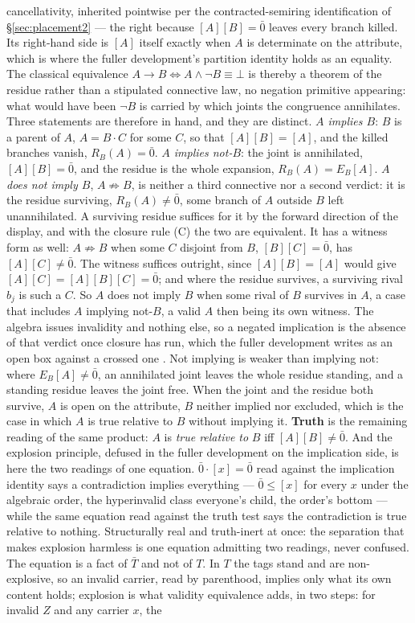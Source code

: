 cancellativity, inherited pointwise per the contracted-semiring identification of \S\ref{sec:placement2} --- the right because $[A][B] = \bar{0}$ leaves every branch killed. Its right-hand side is $[A]$ itself exactly when $A$ is determinate on the attribute, which is where the fuller development's partition identity holds as an equality. The classical equivalence $A \to B \iff A \wedge \lnot B \equiv \bot$ is thereby a theorem of the residue rather than a stipulated connective law, no negation primitive appearing: what would have been $\lnot B$ is carried by which joints the congruence annihilates. Three statements are therefore in hand, and they are distinct. \emph{$A$ implies $B$}: $B$ is a parent of $A$, $A = B \cdot C$ for some $C$, so that $[A][B] = [A]$, and the killed branches vanish, $R_B(A) = \bar{0}$. \emph{$A$ implies not-$B$}: the joint is annihilated, $[A][B] = \bar{0}$, and the residue is the whole expansion, $R_B(A) = E_B[A]$. \emph{$A$ does not imply $B$}, $A \not\Rightarrow B$, is neither a third connective nor a second verdict: it is the residue surviving, $R_B(A) \neq \bar{0}$, some branch of $A$ outside $B$ left unannihilated. A surviving residue suffices for it by the forward direction of the display, and with the closure rule (C) the two are equivalent. It has a witness form as well: $A \not\Rightarrow B$ when some $C$ disjoint from $B$, $[B][C] = \bar{0}$, has $[A][C] \neq \bar{0}$. The witness suffices outright, since $[A][B] = [A]$ would give $[A][C] = [A][B][C] = \bar{0}$; and where the residue survives, a surviving rival $b_j$ is such a $C$. So $A$ does not imply $B$ when some rival of $B$ survives in $A$, a case that includes $A$ implying not-$B$, a valid $A$ then being its own witness. The algebra issues invalidity and nothing else, so a negated implication is the absence of that verdict once closure has run, which the fuller development writes as an open box against a crossed one \cite{Aethus}. Not implying is weaker than implying not: where $E_B[A] \neq \bar{0}$, an annihilated joint leaves the whole residue standing, and a standing residue leaves the joint free. When the joint and the residue both survive, $A$ is open on the attribute, $B$ neither implied nor excluded, which is the case in which $A$ is true relative to $B$ without implying it. \textbf{Truth} is the remaining reading of the same product: $A$ is \emph{true relative to} $B$ iff $[A][B] \neq \bar{0}$. And the explosion principle, defused in the fuller development on the implication side, is here the two readings of one equation. $\bar{0}\cdot[x] = \bar{0}$ read against the implication identity says a contradiction implies everything --- $\bar{0} \leq [x]$ for every $x$ under the algebraic order, the hyperinvalid class everyone's child, the order's bottom --- while the same equation read against the truth test says the contradiction is true relative to nothing. Structurally real and truth-inert at once: the separation that makes explosion harmless is one equation admitting two readings, never confused. The equation is a fact of $\bar{T}$ and not of $T$. In $T$ the tags stand and are non-explosive, so an invalid carrier, read by parenthood, implies only what its own content holds; explosion is what validity equivalence adds, in two steps: for invalid $Z$ and any carrier $x$, the 